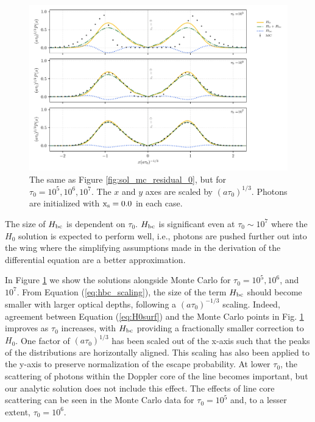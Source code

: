 \documentclass[linenumbers]{aastex63}
\begin{document}
 \begin{figure}
    \centering
    \includegraphics[width=\textwidth]{tau_threepanel.pdf}
    \caption{The same as Figure \ref{fig:sol_mc_residual_0}, but for $\tau_0 = 10^5, 10^6, 10^7$. The $x$ and $y$ axes are scaled by $(a\tau_0)^{1/3}$. Photons are initialized with $\rm x_s = 0.0$ in each case.}
    \label{fig:sol_mc_tau}
\end{figure}

The size of $H_{\rm bc}$ is dependent on $\tau_0$. $H_{\rm bc}$ is significant even at $\tau_0 {\sim} 10^7$ where the $H_0$ solution is expected to perform well, i.e., photons are pushed further out into the wing where the simplifying assumptions made in the derivation of the differential equation are a better approximation. 

In Figure \ref{fig:sol_mc_tau} we show the solutions alongside Monte Carlo for $\tau_0=10^5, 10^6$, and $10^7$. From Equation (\ref{eq:hbc_scaling}), the size of the term $H_{\rm bc}$ should become smaller with larger optical depths, following a $(a\tau_0)^{-1/3}$ scaling. Indeed, agreement between Equation (\ref{eq:H0surf}) and the Monte Carlo points in Fig. \ref{fig:sol_mc_tau} improves as $\tau_0$ increases, with $H_{\rm bc}$ providing a fractionally smaller correction to $H_0$. One factor of $(a\tau_0)^{1/3}$ has been scaled out of the x-axis such that the peaks of the distributions are horizontally aligned. This scaling has also been applied to the y-axis to preserve normalization of the escape probability. At lower $\tau_0$, the scattering of photons within the Doppler core of the line becomes important, but our analytic solution does not include this effect. The effects of line core scattering can be seen in the Monte Carlo data for $\tau_0=10^5$ and, to a lesser extent, $
\tau_0=10^6$.
 
\end{document}
